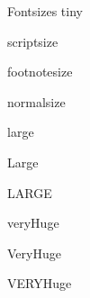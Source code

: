 \documentclass[final]{beamer}
\title[\PosterTitle]{\PosterTitle}
\author[\PosterAuthors]{\PosterAuthors}
\institute[\UniName]{\UniDeptName ,\UniName}
\date{\PresentationDate}
\begin{document}
\begin{frame}{} 
  \vfill
  \begin{block}{\large Fontsizes}
    \centering
    {\tiny tiny}\par
    {\scriptsize scriptsize}\par
    {\footnotesize footnotesize}\par
    {\normalsize normalsize}\par
    {\large large}\par
    {\Large Large}\par
    {\LARGE LARGE}\par
    {\veryHuge veryHuge}\par
    {\VeryHuge VeryHuge}\par
    {\VERYHuge VERYHuge}\par
  \end{block}
  \vfill
\end{frame}
\end{document}
